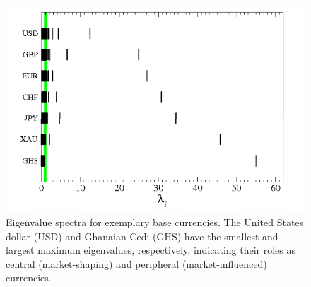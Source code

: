 \documentclass[a4paper]{article}
\begin{document}
\begin{multicols}{2}
\begin{figure}[H]
    \includegraphics[totalheight=5cm]{BaseEigenvalues.PNG}
    \caption{Eigenvalue spectra for exemplary base currencies. The United States dollar (USD) and Ghanaian Cedi (GHS) have the smallest and largest maximum eigenvalues, respectively, indicating their roles as central (market-shaping) and peripheral (market-influenced) currencies.}	
    \label{fig:fxeigenspectra}
\end{figure}


\end{multicols}
\end{document}
